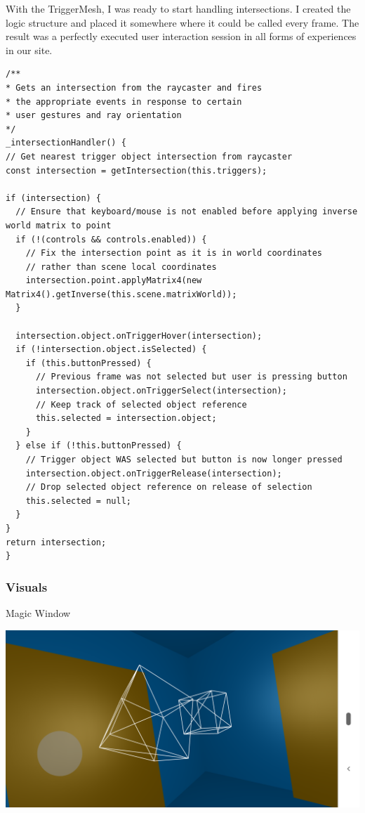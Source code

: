 \documentclass[onecolumn, draftclsnofoot,10pt, compsoc]{IEEEtran}
\begin{document}
    With the TriggerMesh, I was ready to start handling intersections. I created the logic structure and placed it somewhere where it could be called every frame. The result was a perfectly executed user interaction session in all forms of experiences in our site.
    \begin{lstlisting}
/**
* Gets an intersection from the raycaster and fires
* the appropriate events in response to certain
* user gestures and ray orientation
*/
_intersectionHandler() {
// Get nearest trigger object intersection from raycaster
const intersection = getIntersection(this.triggers);

if (intersection) {
  // Ensure that keyboard/mouse is not enabled before applying inverse world matrix to point
  if (!(controls && controls.enabled)) {
    // Fix the intersection point as it is in world coordinates
    // rather than scene local coordinates
    intersection.point.applyMatrix4(new Matrix4().getInverse(this.scene.matrixWorld));
  }

  intersection.object.onTriggerHover(intersection);
  if (!intersection.object.isSelected) {
    if (this.buttonPressed) {
      // Previous frame was not selected but user is pressing button
      intersection.object.onTriggerSelect(intersection);
      // Keep track of selected object reference
      this.selected = intersection.object;
    }
  } else if (!this.buttonPressed) {
    // Trigger object WAS selected but button is now longer pressed
    intersection.object.onTriggerRelease(intersection);
    // Drop selected object reference on release of selection
    this.selected = null;
  }
}
return intersection;
}
    \end{lstlisting}
    
    \subsubsection{Visuals}
    Magic Window
    
    \includegraphics[width=\linewidth]{images/MagicWindow.png}
    
\end{document}
